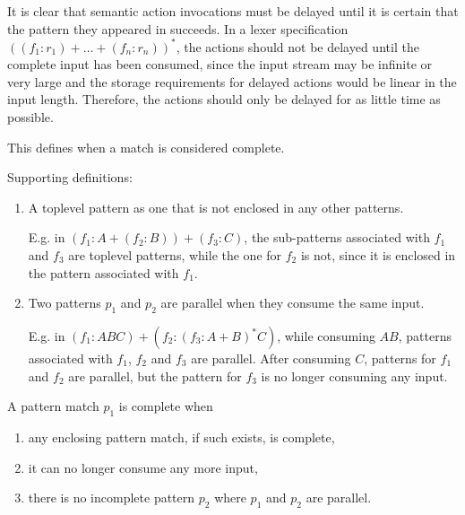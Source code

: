 It is clear that semantic action invocations must be delayed until it is certain
that the pattern they appeared in succeeds. In a lexer specification $((f_1:r_1)
+ \dots + (f_n:r_n))^*$, the actions should not be delayed until the complete
input has been consumed, since the input stream may be infinite or very large
and the storage requirements for delayed actions would be linear in the input
length. Therefore, the actions should only be delayed for as little time as
possible.

\begin{defn}
   This defines when a match is considered complete.

   Supporting definitions:
   \begin{enumerate}

      \item A toplevel pattern as one that is not enclosed in any other patterns.
         
         E.g. in $(f_1:A+(f_2:B))+(f_3:C)$, the sub-patterns associated with
         $f_1$ and $f_3$ are toplevel patterns, while the one for $f_2$ is not,
         since it is enclosed in the pattern associated with $f_1$.

      \item Two patterns $p_1$ and $p_2$ are parallel when they consume the same
         input.

         E.g. in $(f_1:ABC)+(f_2:(f_3:A+B)^*C)$, while consuming $AB$, patterns
         associated with $f_1$, $f_2$ and $f_3$ are parallel. After consuming
         $C$, patterns for $f_1$ and $f_2$ are parallel, but the pattern for
         $f_3$ is no longer consuming any input.

   \end{enumerate}

   A pattern match $p_1$ is complete when
   \begin{enumerate}

      \item any enclosing pattern match, if such exists, is complete,

      \item it can no longer consume any more input,

      \item there is no incomplete pattern $p_2$ where $p_1$ and $p_2$ are
         parallel.

   \end{enumerate}

\end{defn}


